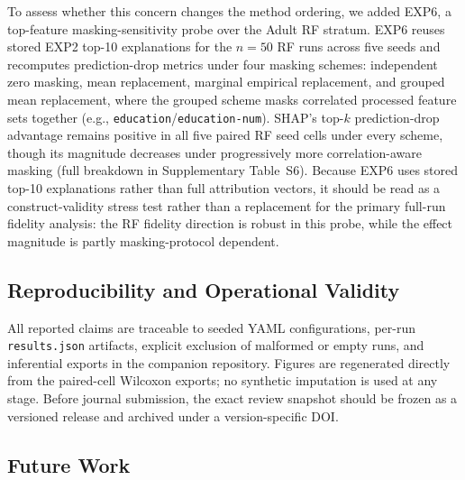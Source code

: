 \documentclass[twoside,11pt]{article}
\begin{document}
To assess whether this concern changes the method ordering, we added EXP6,
a top-feature masking-sensitivity probe over the Adult RF stratum. EXP6
reuses stored EXP2 top-10 explanations for the $n=50$ RF runs across five
seeds and recomputes prediction-drop metrics under four masking schemes:
independent zero masking, mean replacement, marginal empirical replacement,
and grouped mean replacement, where the grouped scheme masks correlated
processed feature sets together (e.g.,
\texttt{education}/\texttt{education-num}). SHAP's top-$k$ prediction-drop
advantage remains positive in all five paired RF seed cells under every
scheme, though its magnitude decreases under progressively more
correlation-aware masking (full breakdown in Supplementary
Table~S6). Because EXP6 uses stored top-10 explanations rather than full
attribution vectors, it should be read as a construct-validity stress test
rather than a replacement for the primary full-run fidelity analysis: the
RF fidelity direction is robust in this probe, while the effect magnitude
is partly masking-protocol dependent.

\subsection{Reproducibility and Operational Validity}

All reported claims are traceable to seeded YAML configurations, per-run
\texttt{results.json} artifacts, explicit exclusion of malformed or empty
runs, and inferential exports in the companion repository. Figures are
regenerated directly from the paired-cell Wilcoxon exports; no synthetic
imputation is used at any stage. Before journal submission, the exact
review snapshot should be frozen as a versioned release and archived under
a version-specific DOI.

\subsection{Future Work}
\end{document}
